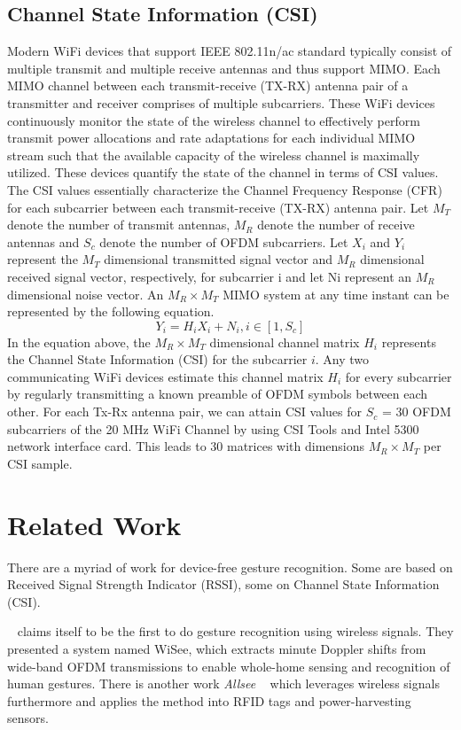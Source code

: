 \documentclass[conference]{IEEEtran}
\begin{document}
\subsection{Channel State Information (CSI)}
Modern WiFi devices that support IEEE 802.11n/ac standard typically consist of multiple transmit and multiple receive antennas and thus support MIMO. Each MIMO channel between each transmit-receive (TX-RX) antenna pair of a transmitter and receiver comprises of multiple subcarriers. These WiFi devices continuously monitor the state of the wireless channel to effectively perform transmit power allocations and rate adaptations for each individual MIMO stream such that the available capacity of the wireless channel is maximally utilized. These devices quantify the state of the channel in terms of CSI values. The CSI values essentially characterize the Channel Frequency Response (CFR) for each subcarrier between each transmit-receive (TX-RX) antenna pair.
Let $M_T$ denote the number of transmit antennas, $M_R$ denote the number of receive antennas and $S_c$ denote the number of OFDM subcarriers. Let $X_i$ and $Y_i$ represent the $M_T$ dimensional transmitted signal vector and $M_R$ dimensional received signal vector, respectively, for subcarrier i and let Ni represent an $M_R$ dimensional noise vector. An $M_R \times M_T$ MIMO system at any time instant can be represented by the following equation.
\begin{equation}
	Y_i = H_iX_i + N_i, i \in [1, S_c]
\end{equation}
In the equation above, the $M_R \times M_T$ dimensional channel matrix $H_i$ represents the Channel State Information (CSI) for the subcarrier $i$. Any two communicating WiFi devices estimate this channel matrix $H_i$ for every subcarrier by regularly transmitting a known preamble of OFDM symbols between each other. For each Tx-Rx antenna pair, we can attain CSI values for $S_c$ = 30 OFDM subcarriers of the 20 MHz WiFi Channel by using CSI Tools and Intel 5300 network interface card. This leads to 30 matrices with dimensions $M_R \times M_T$ per CSI sample.
\section{Related Work}
There are a myriad of work for device-free gesture recognition. Some are based on Received Signal Strength Indicator (RSSI), some on Channel State Information (CSI).

~\cite{pu2013whole} claims itself to be the first to do gesture recognition using wireless signals. 
They presented a system named WiSee, which extracts minute Doppler shifts from wide-band OFDM transmissions to enable whole-home sensing and recognition of human gestures.
There is another work \emph{Allsee} ~\cite{kellogg2014bringing} which leverages wireless signals furthermore and applies the method into RFID tags and power-harvesting sensors.
\end{document}
